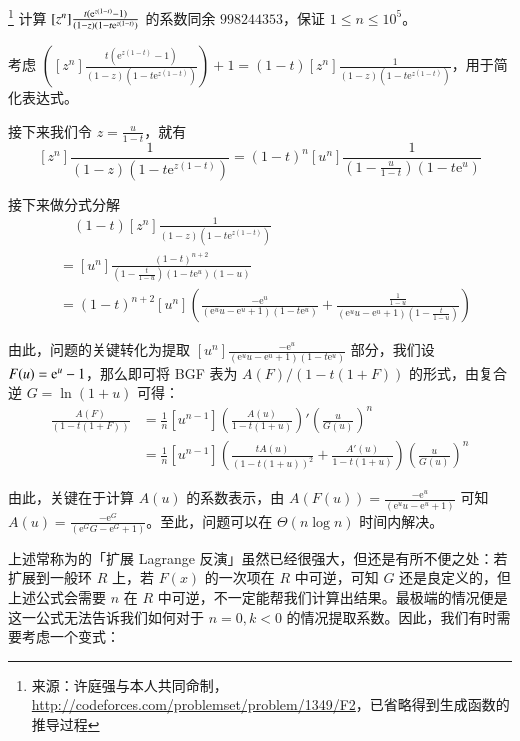 \begin{problem}\footnote{来源：许庭强与本人共同命制，\url{http://codeforces.com/problemset/problem/1349/F2}，已省略得到生成函数的推导过程}
计算 $[z^n]\frac{t(\mathrm{e}^{z(1-t)}-1)}{(1-z)(1-t\mathrm{e}^{z(1-t)})}$ 的系数同余 $998244353$，保证 $1\le n\le 10^5$。
\end{problem}

\begin{solution} 考虑 $\left([z^n]\frac{t(\mathrm e^{z(1-t)}-1)}{(1-z) (1-t \mathrm e^{z(1-t)})}\right) + 1 = (1-t)[z^n] \frac 1{(1-z)(1-t\mathrm e^{z(1-t)})}$，用于简化表达式。

接下来我们令 $z = \frac u{1-t}$，就有
$$
[z^n]\frac 1{(1-z)(1-t\mathrm e^{z(1-t)})} = (1-t)^n[u^n] \frac1{(1-\frac u{1-t})(1-t\mathrm{e}^u)}
$$

接下来做分式分解
\begin{align*}
 &\quad (1-t)[z^n] \frac 1{(1-z)(1-t\mathrm e^{z(1-t)})}\\
 &= [u^n]\frac{(1-t)^{n+2}}{(1-\frac{t}{1-u})(1-t\mathrm e^u)(1-u)}\\
 &= (1-t)^{n+2} [u^n] \left(\frac{-\mathrm e^u}{\left(\mathrm e^u u-\mathrm e^u+1\right) \left(1-t \mathrm e^u\right)}+\frac{\frac{1}{1-u}}{\left(\mathrm e^u   u-\mathrm e^u+1\right) (1-\frac{t}{1-u})}\right)\end{align*}

由此，问题的关键转化为提取 $[u^n] \frac{-\mathrm e^u}{\left(\mathrm e^u u-\mathrm e^u+1\right) \left(1-t \mathrm e^u\right)}$ 部分，我们设 $F(u) = \mathrm{e}^u-1$，那么即可将 BGF 表为 $A(F)/(1-t(1+F))$ 的形式，由复合逆 $G=\ln(1+u)$ 可得：
\begin{align*}
[u^n] \frac{A(F)}{(1-t(1+F))}
&= \frac 1n[u^{n-1}] \left(\frac{A(u)}{1-t(1+u)}\right)' \left(\frac u{G(u)}\right)^n\\
&= \frac 1n[u^{n-1}] \left( \frac{tA(u)}{(1-t(1+u))^2} + \frac{A'(u)}{1-t(1+u)} \right) \left(\frac u{G(u)}\right)^n
\end{align*}

由此，关键在于计算 $A(u)$ 的系数表示，由 $A(F(u)) = \frac{-\mathrm e^u}{\left(\mathrm e^u u-\mathrm e^u+1\right)}$ 可知 $A(u) = \frac{-\mathrm e^G}{\left(\mathrm e^G G-\mathrm e^G+1\right)}$。至此，问题可以在 $\Theta(n\log n)$ 时间内解决。
\end{solution}

上述常称为的「扩展 Lagrange 反演」虽然已经很强大，但还是有所不便之处：若扩展到一般环 $R$ 上，若 $F(x)$ 的一次项在 $R$ 中可逆，可知 $G$ 还是良定义的，但上述公式会需要 $n$ 在 $R$ 中可逆，不一定能帮我们计算出结果。最极端的情况便是这一公式无法告诉我们如何对于 $n=0,k<0$ 的情况提取系数。因此，我们有时需要考虑一个变式：


